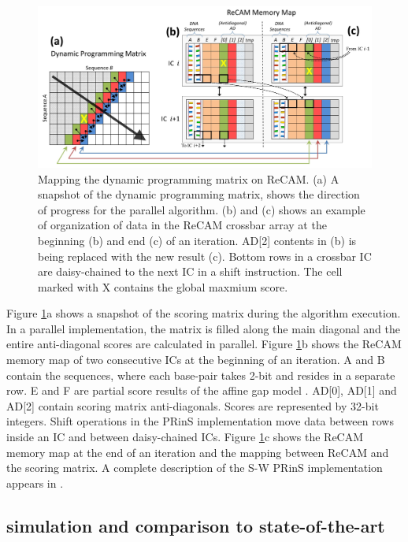 \documentclass{superfri}
\begin{document}
\begin{figure}[h!]
	\centerline{\includegraphics[scale=0.6]{Figures/SW_on_ReCAM_Figure.jpg}}
	\caption{Mapping the dynamic programming matrix on ReCAM. (a) A snapshot of the dynamic programming matrix, shows the direction of progress for the parallel algorithm. (b) and (c) shows an example of organization of data in the ReCAM crossbar array at the beginning (b) and end (c) of an iteration. AD[2] contents in (b) is being replaced with the new result (c). Bottom rows in a crossbar IC are daisy-chained to the next IC in a shift instruction. The cell marked with X contains the global maxmium score.}
	\label{fig:SWonReCAM}
\end{figure}

Figure \ref{fig:SWonReCAM}a shows a snapshot of the scoring matrix during the algorithm execution. In a parallel implementation, the matrix is filled along the main diagonal and the entire anti-diagonal scores are calculated in parallel. Figure \ref{fig:SWonReCAM}b shows the ReCAM memory map of two consecutive ICs at the beginning of an iteration. A and B contain the sequences, where each base-pair takes 2-bit and resides in a separate row. E and F are partial score results of the affine gap model \cite{giridhar2013exploring}. AD[0], AD[1] and AD[2] contain scoring matrix anti-diagonals. Scores are represented by 32-bit integers. Shift operations in the PRinS implementation move data between rows inside an IC and between daisy-chained ICs. Figure \ref{fig:SWonReCAM}c shows the ReCAM memory map at the end of an iteration and the mapping between ReCAM and the scoring matrix. A complete description of the S-W PRinS implementation appears in \cite{kaplan2017resistive}.

\subsection{simulation and comparison to state-of-the-art}
\label{sec:SW_simulation}
\end{document}
